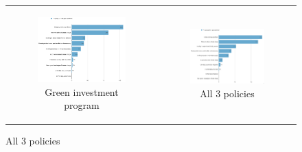 \documentclass{article}
\begin{document}
\begin{figure}[h!]
\begin{center}
	\begin{tabular}{cc}
		\begin{subfigure}{0.5\textwidth}
		\caption{Green investment program}
			\includegraphics[width=\textwidth]{gelbach_urban_investments_D2SD}
		\end{subfigure}&
		\begin{subfigure}{0.5\textwidth}
		\caption{All 3 policies}
			\includegraphics[width=\textwidth]{gelbach_urban_main_policies_D2SD}
		\end{subfigure}\\
	\end{tabular}
\end{center}

\end{figure}
\end{document}
